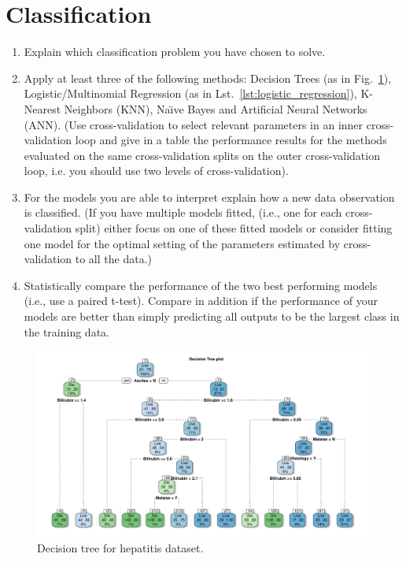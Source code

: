 \documentclass[10pt, paper=a4]{article}
\begin{document}
\section{Classification}
\label{sec:classification}
\begin{enumerate}
\item Explain which classification problem you have chosen to solve.
\item Apply at least three of the following methods: Decision Trees
  (as in Fig.~\ref{fig:decision_tree}), Logistic/Multinomial
  Regression (as in Lst.~\ref{lst:logistic_regression}), K-Nearest
  Neighbors (KNN), Naı̈ve Bayes and Artificial Neural Networks (ANN).
  (Use cross-validation to select relevant parameters in an inner
  cross-validation loop and give in a table the performance results
  for the methods evaluated on the same cross-validation splits on the
  outer cross-validation loop, i.e. you should use two levels of
  cross-validation).
\item For the models you are able to interpret explain how a new data
  observation is classified.  (If you have multiple models fitted,
  (i.e., one for each cross-validation split) either focus on one of
  these fitted models or consider fitting one model for the optimal
  setting of the parameters estimated by cross-validation to all the
  data.)
\item Statistically compare the performance of the two best performing
  models (i.e., use a paired t-test). Compare in addition if the
  performance of your models are better than simply predicting all
  outputs to be the largest class in the training data.
\end{enumerate}

\begin{figure}[htbp]
  \centering
  \includegraphics[width = 0.99\textwidth]{decision_tree.pdf}
  \caption{Decision tree for hepatitis dataset.}
  \label{fig:decision_tree}
\end{figure}
\end{document}
